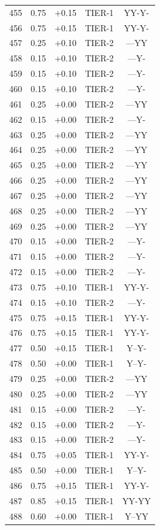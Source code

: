\begin{longtable}{rlclc}
455 & 0.75 & +0.15 & TIER-1 & YY-Y-\\
456 & 0.75 & +0.15 & TIER-1 & YY-Y-\\
457 & 0.25 & +0.10 & TIER-2 & ---YY\\
458 & 0.15 & +0.10 & TIER-2 & ---Y-\\
459 & 0.15 & +0.10 & TIER-2 & ---Y-\\
460 & 0.15 & +0.10 & TIER-2 & ---Y-\\
461 & 0.25 & +0.00 & TIER-2 & ---YY\\
462 & 0.15 & +0.00 & TIER-2 & ---Y-\\
463 & 0.25 & +0.00 & TIER-2 & ---YY\\
464 & 0.25 & +0.00 & TIER-2 & ---YY\\
465 & 0.25 & +0.00 & TIER-2 & ---YY\\
466 & 0.25 & +0.00 & TIER-2 & ---YY\\
467 & 0.25 & +0.00 & TIER-2 & ---YY\\
468 & 0.25 & +0.00 & TIER-2 & ---YY\\
469 & 0.25 & +0.00 & TIER-2 & ---YY\\
470 & 0.15 & +0.00 & TIER-2 & ---Y-\\
471 & 0.15 & +0.00 & TIER-2 & ---Y-\\
472 & 0.15 & +0.00 & TIER-2 & ---Y-\\
473 & 0.75 & +0.10 & TIER-1 & YY-Y-\\
474 & 0.15 & +0.10 & TIER-2 & ---Y-\\
475 & 0.75 & +0.15 & TIER-1 & YY-Y-\\
476 & 0.75 & +0.15 & TIER-1 & YY-Y-\\
477 & 0.50 & +0.15 & TIER-1 & Y--Y-\\
478 & 0.50 & +0.00 & TIER-1 & Y--Y-\\
479 & 0.25 & +0.00 & TIER-2 & ---YY\\
480 & 0.25 & +0.00 & TIER-2 & ---YY\\
481 & 0.15 & +0.00 & TIER-2 & ---Y-\\
482 & 0.15 & +0.00 & TIER-2 & ---Y-\\
483 & 0.15 & +0.00 & TIER-2 & ---Y-\\
484 & 0.75 & +0.05 & TIER-1 & YY-Y-\\
485 & 0.50 & +0.00 & TIER-1 & Y--Y-\\
486 & 0.75 & +0.15 & TIER-1 & YY-Y-\\
487 & 0.85 & +0.15 & TIER-1 & YY-YY\\
488 & 0.60 & +0.00 & TIER-1 & Y--YY\\

\end{longtable}

